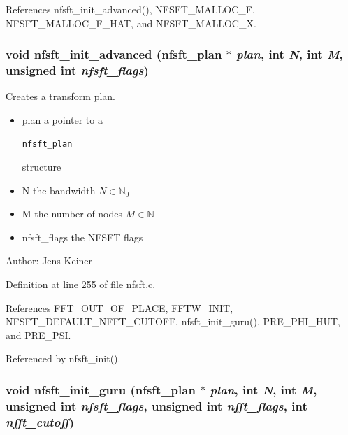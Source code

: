 References nfsft\_\-init\_\-advanced(), NFSFT\_\-MALLOC\_\-F, NFSFT\_\-MALLOC\_\-F\_\-HAT, and NFSFT\_\-MALLOC\_\-X.\hypertarget{group__nfsft_ge7dca3e41afdb39e8c518af414878c18}{
\subsubsection{\setlength{\rightskip}{0pt plus 5cm}void nfsft\_\-init\_\-advanced ({\bf nfsft\_\-plan} $\ast$ {\em plan}, int {\em N}, int {\em M}, unsigned int {\em nfsft\_\-flags})}}
\label{group__nfsft_ge7dca3e41afdb39e8c518af414878c18}


Creates a transform plan. 

\begin{itemize}
\item plan a pointer to a 

\footnotesize\begin{verbatim}nfsft_plan \end{verbatim}
\normalsize
 structure \item N the bandwidth $N \in \mathbb{N}_0$ \item M the number of nodes $M \in \mathbb{N}$ \item nfsft\_\-flags the NFSFT flags\end{itemize}
\begin{Desc}
\item[Author:]Jens Keiner \end{Desc}


Definition at line 255 of file nfsft.c.

References FFT\_\-OUT\_\-OF\_\-PLACE, FFTW\_\-INIT, NFSFT\_\-DEFAULT\_\-NFFT\_\-CUTOFF, nfsft\_\-init\_\-guru(), PRE\_\-PHI\_\-HUT, and PRE\_\-PSI.

Referenced by nfsft\_\-init().\hypertarget{group__nfsft_g60466ed37643b6b7b7c1638056604d2b}{
\subsubsection{\setlength{\rightskip}{0pt plus 5cm}void nfsft\_\-init\_\-guru ({\bf nfsft\_\-plan} $\ast$ {\em plan}, int {\em N}, int {\em M}, unsigned int {\em nfsft\_\-flags}, unsigned int {\em nfft\_\-flags}, int {\em nfft\_\-cutoff})}}
\label{group__nfsft_g60466ed37643b6b7b7c1638056604d2b}


